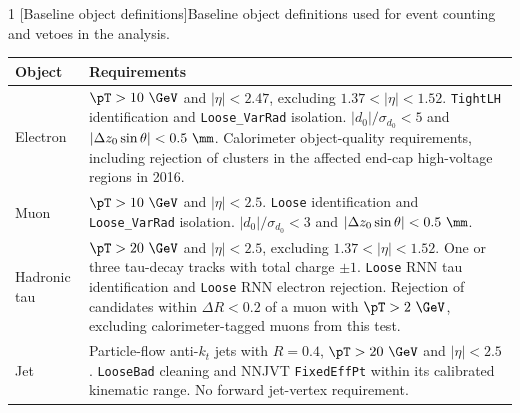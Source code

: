 \medskip
\noindent\begin{minipage}{\textwidth}
    \begin{spacing}{1}
    \centering
    \small
    [Baseline object definitions]{Baseline object definitions used for event counting and vetoes in the analysis.}
    \label{tab:ch6_baseline_objects}
    \begin{tabular}{@{}p{}p{}@{}}
        \toprule
        Object & Requirements \\
        \midrule
        Electron & $\pT>10~\GeV$ and $|\eta|<2.47$, excluding $1.37<|\eta|<1.52$.\newline
        \texttt{TightLH} identification and \texttt{Loose\_VarRad} isolation.\newline
        $|d_0|/\sigma_{d_0}<5$ and $|\Delta z_0\sin\theta|<0.5~\mm$.\newline
        Calorimeter object-quality requirements, including rejection of clusters in the affected end-cap high-voltage regions in 2016. \\
        \addlinespace[0.6em]
        Muon & $\pT>10~\GeV$ and $|\eta|<2.5$.\newline
        \texttt{Loose} identification and \texttt{Loose\_VarRad} isolation.\newline
        $|d_0|/\sigma_{d_0}<3$ and $|\Delta z_0\sin\theta|<0.5~\mm$. \\
        \addlinespace[0.6em]
        Hadronic tau & $\pT>20~\GeV$ and $|\eta|<2.5$, excluding $1.37<|\eta|<1.52$.\newline
        One or three tau-decay tracks with total charge $\pm1$.\newline
        \texttt{Loose} RNN tau identification and \texttt{Loose} RNN electron rejection.\newline
        Rejection of candidates within $\Delta R<0.2$ of a muon with $\pT>2~\GeV$, excluding calorimeter-tagged muons from this test. \\
        \addlinespace[0.6em]
        Jet & Particle-flow anti-$k_t$ jets with $R=0.4$, $\pT>20~\GeV$ and $|\eta|<2.5$.\newline
        \texttt{LooseBad} cleaning and NNJVT \texttt{FixedEffPt} within its calibrated kinematic range.\newline
        No forward jet-vertex requirement. \\
        \bottomrule
    \end{tabular}
    \end{spacing}
\end{minipage}

